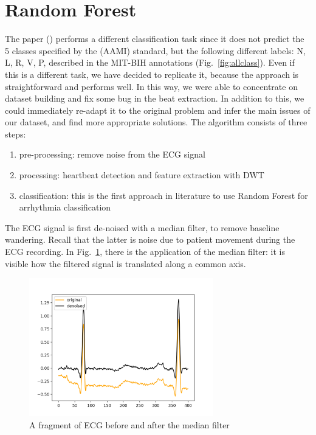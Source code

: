 \documentclass[LaM,binding=0.6cm]{sapthesis}
\begin{document}
\section{Random Forest \cite{forest}}
The paper (\cite{forest}) performs a different classification task since it does not predict the 5 classes specified by the (AAMI) standard, but the following different labels: N, L, R, V, P, described in the MIT-BIH annotations (Fig.~\ref{fig:allclass}). Even if this is a different task, we have decided to replicate it, because the approach is straightforward and performs well. In this way, we were able to concentrate on dataset building and fix some bug in the beat extraction. In addition to this, we could immediately re-adapt it to the original problem and infer the main issues of our dataset, and find more appropriate solutions. The algorithm consists of three steps:
\begin{enumerate}
\item pre-processing: remove noise from the ECG signal
\item processing: heartbeat detection and feature extraction with DWT
\item classification: this is the first approach in literature to use Random Forest for arrhythmia classification
\end{enumerate} 
The ECG signal is first de-noised with a median filter, to remove baseline wandering. Recall that the latter is noise due to patient movement during the ECG recording. In Fig.~\ref{fig:rf1}, there is the application of the median filter: it is visible how the filtered signal is translated along a common axis. 
\begin{figure}  \centering
    \includegraphics[width=80mm,scale=0.7]{random-forest-before-after}
    \caption{A fragment of ECG before and after the median filter}
    \label{fig:rf1}
\end{figure}
\end{document}
